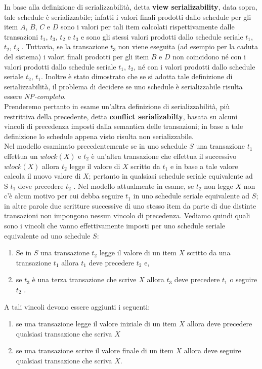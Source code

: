In base alla definizione di serializzabilità, detta \textbf{view serializability}, data sopra, tale schedule è
serializzabile; infatti i valori finali prodotti dallo schedule per gli item $A$, $B$, $C$ e $D$ sono i valori per
tali item calcolati rispettivamente dalle transazioni $t_1$, $t_3$, $t_2$ e $t_3$ e sono gli stessi valori prodotti
dallo schedule seriale $t_1$, $t_2$, $t_3$ . Tuttavia, se la transazione $t_3$ non viene eseguita (ad esempio per la
caduta del sistema) i valori finali prodotti per gli item $B$ e $D$ non coincidono né con i valori prodotti
dallo schedule seriale $t_1$, $t_2$, né con i valori prodotti dallo schedule seriale $t_2$, $t_1$.
Inoltre è stato dimostrato che se si adotta tale definizione di serializzabilità, il problema di decidere
se uno schedule è serializzabile risulta essere \emph{NP-completo}.\\
Prenderemo pertanto in esame un'altra definizione di serializzabilità, più restrittiva della
precedente, detta \textbf{conflict serializabilty}, basata su alcuni vincoli di precedenza imposti dalla
semantica delle transazioni; in base a tale definizione lo schedule appena visto risulta non
serializzabile.\\
Nel modello esaminato precedentemente se in uno schedule $S$ una transazione $t_1$ effettua un
$wlock(X)$ e $t_2$ è un'altra transazione che effettua il successivo $wlock(X)$ allora $t_2$ legge il valore di
$X$ scritto da $t_1$ e in base a tale valore calcola il nuovo valore di $X$; pertanto in qualsiasi schedule
seriale equivalente ad S $t_1$ deve precedere $t_2$ . Nel modello attualmente in esame, se $t_2$ non legge $X$
non c'è alcun motivo per cui debba seguire $t_1$ in uno schedule seriale equivalente ad $S$; in altre
parole due scritture successive di uno stesso item da parte di due distinte transazioni non
impongono nessun vincolo di precedenza. Vediamo quindi quali sono i vincoli che vanno
effettivamente imposti per uno schedule seriale equivalente ad uno schedule $S$:
\begin{enumerate}
 \item Se in $S$ una transazione $t_2$ legge il valore di un item $X$ scritto da una transazione $t_1$ allora $t_1$
deve precedere $t_2$ e,
 \item se $t_3$ è una terza transazione che scrive $X$ allora $t_3$ deve precedere $t_1$ o seguire $t_2$ .
\end{enumerate}
A tali vincoli devono essere aggiunti i seguenti:
\begin{enumerate}
\item se una transazione legge il valore iniziale di un item $X$ allora deve precedere qualsiasi
transazione che scriva $X$
\item se una transazione scrive il valore finale di un item $X$ allora deve seguire qualsiasi transazione
che scriva $X$.
\end{enumerate}

